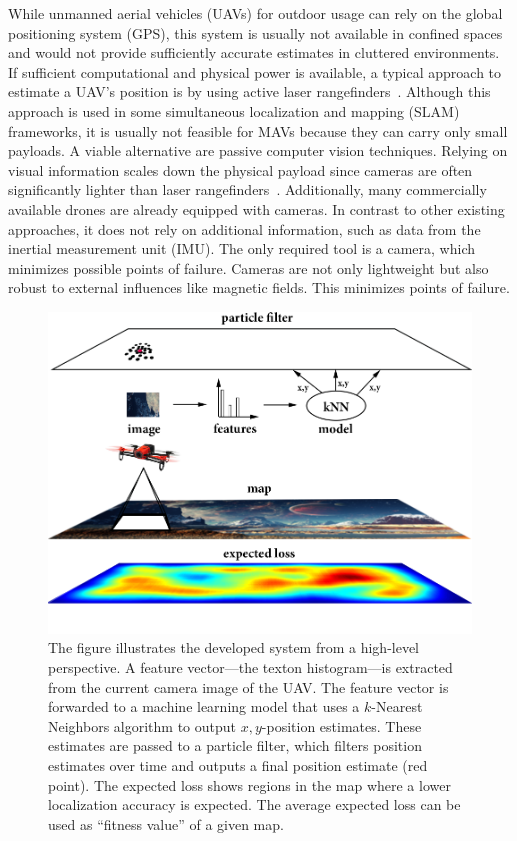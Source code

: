 \documentclass[11pt]{report}
\begin{document}
While unmanned aerial vehicles (UAVs) for outdoor usage can rely on
the global positioning system (GPS), this system is usually not
available in confined spaces and would not provide sufficiently
accurate estimates in cluttered environments. If sufficient
computational and physical power is available, a typical approach to
estimate a UAV's position is by using active laser
rangefinders~\cite{grzonka2009towards,bachrach2009autonomous}.
Although this approach is used in some simultaneous localization and
mapping (SLAM) frameworks, it is usually not feasible for MAVs because
they can carry only small payloads. A viable alternative are passive
computer vision techniques. Relying on visual information scales down
the physical payload since cameras are often significantly lighter
than laser
rangefinders~\cite{blosch2010vision,angeli20062d,ahrens2009vision}.
Additionally, many commercially available drones are already equipped
with cameras.  In contrast to other existing approaches, it does not
rely on additional information, such as data from the inertial
measurement unit (IMU). The only required tool is a camera, which
minimizes possible points of failure. Cameras are not only lightweight
but also robust to external influences like magnetic fields. This
minimizes points of failure.
\begin{figure}[h!]
\begin{center}
\includegraphics[width=0.75\columnwidth]{nutshell}
\caption{{\label{fig:highleveloverview} The figure illustrates the
    developed system from a high-level perspective. A feature
    vector---the texton histogram---is extracted from the current
    camera image of the UAV. The feature vector is forwarded to a
    machine learning model that uses a $k$-Nearest Neighbors algorithm
    to output $x,y$-position estimates. These estimates are passed to
    a particle filter, which filters position estimates over time and
    outputs a final position estimate (red point). The expected loss
    shows regions in the map where a lower localization accuracy is
    expected. The average expected loss can be used as ``fitness
    value'' of a given map.%
  }}
\end{center}
\end{figure}
\end{document}
